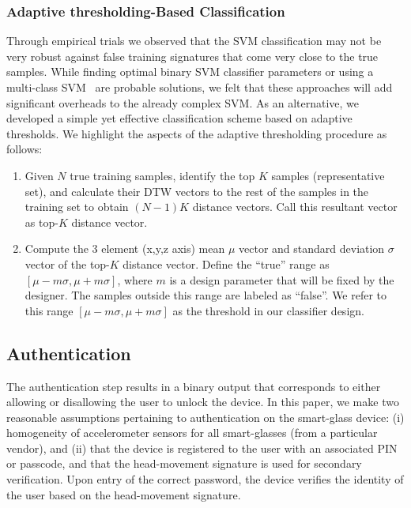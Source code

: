 \subsubsection{Adaptive thresholding-Based Classification}

Through empirical trials we observed that the SVM classification may not be very
robust against false training signatures that come very close to the true
samples. While finding optimal binary SVM classifier parameters or using a
multi-class SVM~\cite{weston1999support} are probable solutions, we felt that these
approaches will add significant overheads to the already complex SVM.
As an alternative, we developed a simple yet effective classification scheme
based on adaptive thresholds.
We highlight the aspects of the adaptive thresholding procedure as follows:
\begin{enumerate}
\item Given $N$ true training samples, identify the top $K$ samples
(representative set), and calculate their DTW vectors to the rest of the
samples in the training set to obtain $(N-1)K$ distance vectors. Call this
resultant vector as top-$K$ distance vector.
\item Compute the 3 element (x,y,z axis) mean $\mu$ vector and standard
deviation $\sigma$ vector of the top-$K$ distance vector. Define the
``true'' range as $[\mu-m\sigma, \mu+m\sigma]$, where $m$ is a design
parameter that will be fixed by the designer. The samples outside this
range are labeled as ``false''.
We refer to this range $[\mu-m\sigma, \mu+m\sigma]$ as the threshold in our
classifier design.
\end{enumerate}

\subsection{Authentication}

The authentication step results in a binary output that corresponds to
either allowing or disallowing the user to unlock the device.
In this paper, we make two reasonable assumptions pertaining to authentication
on the smart-glass device: (i) homogeneity of
accelerometer sensors for all smart-glasses (from a particular vendor), and (ii)
that the device is registered to the user with an associated PIN or passcode,
and that the head-movement signature is used for secondary verification.
Upon entry of the correct password, the device verifies the identity
of the user based on the head-movement signature.

